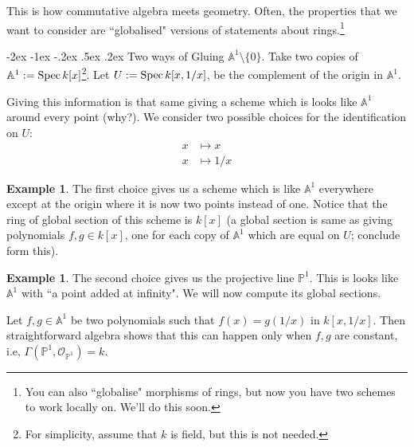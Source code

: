 \documentclass[11pt]{amsart}
\makeatletter
\renewcommand\subsection{\@startsection {subsection}{1}{\z@}%
	{-2ex \@plus -1ex \@minus -.2ex}%
	{.5ex \@plus.2ex}%
	{\normalfont\bfseries}}
\newcommand{\Spec}{{\rm Spec \,}}
\newcommand{\sO}{{\mathcal O}}
\newcommand{\A}{{\mathbb A}}
\renewcommand{\P}{{\mathbb P}}
\theoremstyle{definition}
\newtheorem{example}[theorem]{Example}
\makeatother
\begin{document}
This is how commutative algebra meets geometry. Often, the properties that we want to consider are ``globalised" versions of statements about rings.\footnote{You can also ``globalise" morphisms of rings, but now you have two schemes to work locally on. We'll do this soon.}

\subsection{Two ways of Gluing \texorpdfstring{$\A^1\setminus \lbrace 0\rbrace$}{Pn}.}
\label{subsection-gluing-A1}
Take two copies of $\A^1:= \Spec k[x]$\footnote{For simplicity, assume that $k$ is field, but this is not needed.}. Let $U:= \Spec k[x,1/x]$, be the complement of the origin in $\A^1$.

\begin{center}
\end{center}

Giving this information is that same giving a scheme which is looks like $\A^1$ around every point (why?). We consider two possible choices for the identification on $U$:
\begin{align*}
x &\mapsto x\\
x &\mapsto 1/x
\end{align*}
\begin{example}\label{example-double-origin}
 The first choice gives us a scheme which is like $\A^1$ everywhere except at the origin where it is now two points instead of one. Notice that the ring of global section of this scheme is $k[x]$ (a global section is same as giving polynomials $f, g\in k[x]$, one for each copy of $\A^1$ which are equal on $U$; conclude form this).
\end{example}

\begin{example}\label{example-projective-line}
The second choice gives us the projective line $\P^1$. This is looks like $\A^1$ with ``a point added at infinity". We will now compute its global sections.

Let $f,g\in\A^1$ be two polynomials such that $f(x)=g(1/x)$ in $k[x,1/x]$. Then straightforward algebra shows that this can happen only when $f, g$ are constant, i.e, $\Gamma(\P^1,\sO_{\P^1})=k$.
\end{example}
\end{document}
